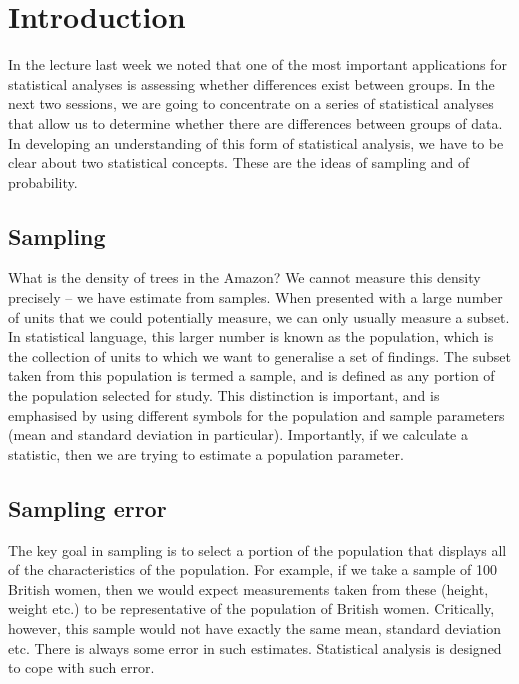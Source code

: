 \documentclass[
]{book}
\begin{document}
\hypertarget{introduction-1}{%
\section{Introduction}\label{introduction-1}}

In the lecture last week we noted that one of the most important applications for statistical analyses is assessing whether differences exist between groups. In the next two sessions, we are going to concentrate on a series of statistical analyses that allow us to determine whether there are differences between groups of data.
In developing an understanding of this form of statistical analysis, we have to be clear about two statistical concepts. These are the ideas of sampling and of probability.

\hypertarget{sampling}{%
\subsection*{Sampling}\label{sampling}}

What is the density of trees in the Amazon? We cannot measure this density precisely -- we have estimate from samples. When presented with a large number of units that we could potentially measure, we can only usually measure a subset. In statistical language, this larger number is known as the population, which is the collection of units to which we want to generalise a set of findings. The subset taken from this population is termed a sample, and is defined as any portion of the population selected for study. This distinction is important, and is emphasised by using different symbols for the population and sample parameters (mean and standard deviation in particular). Importantly, if we calculate a statistic, then we are trying to estimate a population parameter.

\hypertarget{sampling-error}{%
\subsection*{Sampling error}\label{sampling-error}}

The key goal in sampling is to select a portion of the population that displays all of the characteristics of the population. For example, if we take a sample of 100 British women, then we would expect measurements taken from these (height, weight etc.) to be representative of the population of British women. Critically, however, this sample would not have exactly the same mean, standard deviation etc. There is always some error in such estimates. Statistical analysis is designed to cope with such error.
\end{document}
